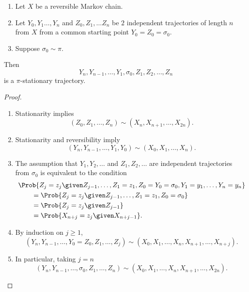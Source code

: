 \documentclass[12pt]{article}
\begin{document}
\begin{lemma}
    \begin{enumerate}
        \item
            Let \( X \) be a reversible Markov chain.
        \item
            Let \( Y_0, Y_1 \dots, Y_n \) and \( Z_0, Z_1, \dots Z_n \)
            be \( 2 \) independent trajectories of length \( n \) from \(
            X \) from a common starting point \( Y_0 = Z_0 = \sigma_0 \).
        \item
            Suppose \( \sigma_0 \sim \pi \).
    \end{enumerate}
    Then
    \[
        Y_n, Y_{n-1}, \dots, Y_1, \sigma_0, Z_1, Z_2, \dots, Z_n
    \] is a \( \pi \)-stationary trajectory.
\end{lemma}

\begin{proof}
    \begin{enumerate}
        \item
            Stationarity implies
            \[
                (Z_0, Z_1, \dots, Z_n) \sim (X_n, X_{n+1}, \dots, X_{2n}).
            \]
        \item
            Stationarity and reversibility imply
            \[
                (Y_n, Y_{n-1}, \dots, Y_1, Y_0) \sim (X_0, X_1, \dots, X_n).
            \]
        \item
            The assumption that \( Y_1, Y_2, \dots \) and \( Z_1, Z_2,
            \dots \) are independent trajectories from \( \sigma_0 \) is
            equivalent to the condition
            \begin{align*}
                & \Prob{ Z_j = z_j \given Z_{j-1}, \dots, Z_1 = z_1, Z_0
                = Y_0=\sigma_0, Y_1=y_1, \dots, Y_n = y_n} \\
                & \qquad = \Prob{ Z_j = z_j \given Z_{j-1}, \dots, Z_1 =
                z_1, Z_0 = \sigma_0} \\
                & \qquad = \Prob{ Z_j = z_j \given Z_{j-1}} \\
                &\qquad = \Prob{ X_{n+j} = z_j \given X_{n+j-1}}.
            \end{align*}
        \item
            By induction on \( j \ge 1 \),
            \[
                (Y_n, Y_{n-1}, \dots, Y_0=Z_0, Z_1, \dots, Z_j) \sim (X_0,
                X_1, \dots, X_n, X_{n+1}, \dots, X_{n+j}).
            \]
        \item
            In particular, taking \( j = n \)
            \[
                (Y_n, Y_{n-1}, \dots, \sigma_0, Z_1, \dots, Z_n) \sim (X_0,
                X_1, \dots, X_n, X_{n+1}, \dots, X_{2n}).
            \]
    \end{enumerate}
\end{proof}
\end{document}
